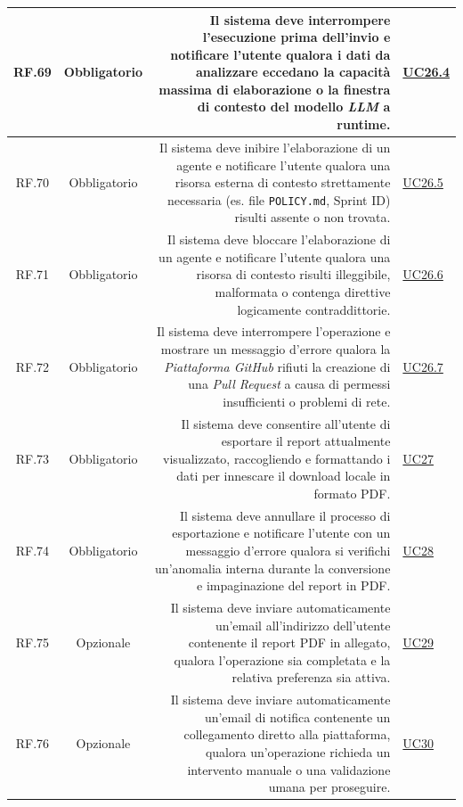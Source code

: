 \documentclass[12pt, a4paper]{article}
\begin{document}
\begin{xltabular}{\textwidth}{|c|c|D|F|}
    RF.69 & Obbligatorio & Il sistema deve interrompere l'esecuzione prima dell'invio e notificare l'utente qualora i dati da analizzare eccedano la capacità massima di elaborazione o la finestra di contesto del modello \textit{LLM} a runtime. & \hyperref[uc:26.4]{UC26.4} \\ \hline
    
    RF.70 & Obbligatorio & Il sistema deve inibire l'elaborazione di un agente e notificare l'utente qualora una risorsa esterna di contesto strettamente necessaria (es. file \texttt{POLICY.md}, Sprint ID) risulti assente o non trovata. & \hyperref[uc:26.5]{UC26.5} \\ \hline
    
    RF.71 & Obbligatorio & Il sistema deve bloccare l'elaborazione di un agente e notificare l'utente qualora una risorsa di contesto risulti illeggibile, malformata o contenga direttive logicamente contraddittorie. & \hyperref[uc:26.6]{UC26.6} \\ \hline
    
    RF.72 & Obbligatorio & Il sistema deve interrompere l'operazione e mostrare un messaggio d'errore qualora la \textit{Piattaforma GitHub} rifiuti la creazione di una \textit{Pull Request} a causa di permessi insufficienti o problemi di rete. & \hyperref[uc:26.7]{UC26.7} \\ \hline
    
    RF.73 & Obbligatorio & Il sistema deve consentire all'utente di esportare il report attualmente visualizzato, raccogliendo e formattando i dati per innescare il download locale in formato PDF. & \hyperref[uc:27]{UC27} \\ \hline
    
    RF.74 & Obbligatorio & Il sistema deve annullare il processo di esportazione e notificare l'utente con un messaggio d'errore qualora si verifichi un'anomalia interna durante la conversione e impaginazione del report in PDF. & \hyperref[uc:28]{UC28} \\ \hline
    
    RF.75 & Opzionale & Il sistema deve inviare automaticamente un'email all'indirizzo dell'utente contenente il report PDF in allegato, qualora l'operazione sia completata e la relativa preferenza sia attiva. & \hyperref[uc:29]{UC29} \\ \hline
    
    RF.76 & Opzionale & Il sistema deve inviare automaticamente un'email di notifica contenente un collegamento diretto alla piattaforma, qualora un'operazione richieda un intervento manuale o una validazione umana per proseguire. & \hyperref[uc:30]{UC30} \\ \hline
    

\end{xltabular}
\end{document}
